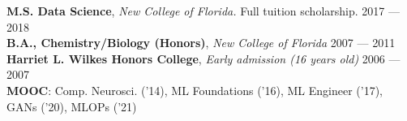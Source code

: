 \documentclass[a4paper,12pt]{article}
\begin{document}
    \textbf{M.S. Data Science}, \textit{New College of Florida.} Full tuition scholarship. \hfill 2017 --- 2018\\
    \textbf{B.A., Chemistry/Biology (Honors)}, \textit{New College of Florida} \hfill 2007 --- 2011\\
    \textbf{Harriet L. Wilkes Honors College}, \textit{Early admission (16 years old)} \hfill 2006 --- 2007\\
    \textbf{MOOC}: Comp. Neurosci. ('14), ML Foundations ('16), ML Engineer ('17), GANs ('20), MLOPs ('21)
\end{document}
